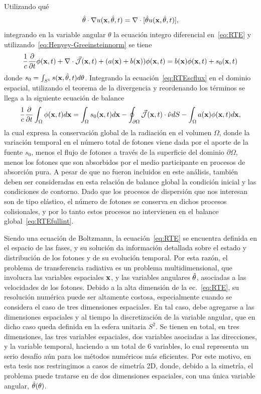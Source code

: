 Utilizando qué
\begin{equation}
\hat{\theta} \cdot \nabla u(\mathbf{x},\hat{\theta},t)=\nabla \cdot [\hat{\theta} u(\mathbf{x},\hat{\theta},t)],
\label{eq:scdiv}
\end{equation}
integrando en la variable angular $\theta$
 la ecuación integro diferencial en~\eqref{eq:RTE} y utilizando~\eqref{eq:Henyey-Greeinsteinnorm}  se tiene
\begin{equation}
\frac{1}{c}\frac{\partial}{\partial t} \phi(\mathbf{x},t)+\nabla \cdot \vec{ \mathcal{J}}(\mathbf{x},t)
+(a(\mathbf{x})+b(\mathbf{x})) \phi(\mathbf{x},t)=b(\mathbf{x})\phi(\mathbf{x},t)+s_0(\mathbf{x},t)
\label{eq:RTEscflux}
\end{equation}
donde $s_0=\int_{S^1}s(\mathbf{x},\hat{\theta},t)d\theta$. Integrando la 
ecuación~\eqref{eq:RTEscflux} en el dominio espacial, utilizando el teorema de la divergencia
y reordenando los términos se llega a la siguiente ecuación de balance
\begin{equation}
\frac{1}{c}\frac{\partial}{\partial t} \int_{\Omega}\phi(\mathbf{x},t)d\mathbf{x} = 
\int_{\Omega}s_0(\mathbf{x},t)d\mathbf{x}- \oint_{\partial \Omega} \vec{ \mathcal{J}}(\mathbf{x},t)\cdot \hat{\nu} dS-\int_{\Omega}a(\mathbf{x})\phi(\mathbf{x},t)d\mathbf{x},
\label{eq:RTEfullint}
\end{equation}
la cual expresa la conservación global de la radiación en el volumen $\Omega$, 
donde la variación temporal en el número total de fotones 
viene dada por el aporte de la fuente $s_0$, menos el flujo de fotones
 a través de la superficie del 
dominio $\partial \Omega$, menos los fotones que son absorbidos 
por el medio participante en procesos de absorción pura. 
A pesar de que no fueron incluidos en este análisis, 
también deben ser consideradas en esta relación de balance global la condición inicial y las 
condiciones de contorno. Dado que 
los procesos de dispersión que nos interesan son de tipo elástico, el número 
de fotones se conserva en dichos procesos colisionales, y por lo tanto 
estos procesos no intervienen en el balance global~\eqref{eq:RTEfullint}. 

Siendo una ecuación de Boltzmann, la ecuación~\eqref{eq:RTE} 
se encuentra definida en el espacio de las fases, 
y su solución da información detallada sobre el estado y distribución 
de los fotones y de su evolución temporal.   Por esta razón, 
el problema de transferencia radiativa es un problema multidimensional, 
que involucra las variables espaciales $\mathbf{x}$, y las variables angulares 
$\hat{\theta}$, asociadas a las velocidades de los fotones. 
Debido a la alta dimensión de la ec.~\eqref{eq:RTE}, su resolución numérica 
puede ser altamente costosa, especialmente cuando se considera el caso de 
tres dimensiones espaciales. En tal caso, debe agregarse a las dimensiones 
espaciales y al tiempo la discretización de la variable angular, 
que en dicho caso queda definida en la esfera unitaria $S^2$. 
Se tienen en total, en tres dimensiones, las tres variables espaciales, 
dos variables asociadas a las direcciones, y la variable temporal, haciendo 
a un total de 6 variables, lo cual representa un serio desafío 
aún para los métodos numéricos más eficientes. 
Por este motivo, en esta tesis nos restringimos a casos de 
simetría 2D, donde, debido a la simetría, el 
problema puede tratarse en de dos dimensiones espaciales, 
con una única variable angular, $\hat{\theta}(\theta)$.


